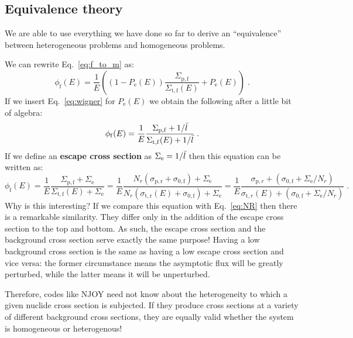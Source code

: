 \documentclass{article}
\begin{document}
\subsection{Equivalence theory}

We are able to use everything we have done so far to derive an ``equivalence'' between heterogeneous problems and homogeneous problems.

We can rewrite Eq.~\eqref{eq:f_to_m} as:
\begin{equation}
    \phi_\mathrm{f}(E) = \frac{1}{E}\left(\left(1-P_{\mathrm{e}}(E)\right)\frac{\Sigma_{\mathrm{p,f}}}{\Sigma_{\mathrm{t,f}}(E)} + P_{\mathrm{e}}(E)\right)\;\mathrm{.}
\end{equation}
If we insert Eq.~\eqref{eq:wigner} for $P_\mathrm{e}(E)$ we obtain the following after a little bit of algebra:
\begin{equation}
    \phi_\mathrm{f}(E) = \frac{1}{E}\frac{\Sigma_\mathrm{p,f}+1/\Bar{l}}{\Sigma_\mathrm{t,f}(E)+1/\Bar{l}}\;\mathrm{.}
\end{equation}
If we define an \textbf{escape cross section} as $\Sigma_\mathrm{e} = 1/\Bar{l}$ then this equation can be written as:
\begin{equation}
    \phi_\mathrm{f}(E) = \frac{1}{E}\frac{\Sigma_\mathrm{p,f}+\Sigma_\mathrm{e}}{\Sigma_\mathrm{t,f}(E) + \Sigma_\mathrm{e}} = \frac{1}{E}\frac{N_r(\sigma_\mathrm{p,r}+\sigma_{0,\mathrm{f}})+\Sigma_\mathrm{e}}{N_r(\sigma_\mathrm{t,r}(E)+\sigma_{0,\mathrm{f}})+\Sigma_\mathrm{e}}=\frac{1}{E}\frac{\sigma_{\mathrm{p},r}+(\sigma_{0,\mathrm{f}}+\Sigma_\mathrm{e}/N_r)}{\sigma_{\mathrm{t},r}(E)+(\sigma_{0,\mathrm{f}}+\Sigma_\mathrm{e}/N_r)}\;\mathrm{.}
\end{equation}
Why is this interesting? If we compare this equation with Eq.~\eqref{eq:NR} then there is a remarkable similarity. They differ only in the addition of the escape cross section to the top and bottom. As such, the escape cross section and the background cross section serve exactly the same purpose! Having a low background cross section is the same as having a low escape cross section and vice versa: the former circumstance means the asymptotic flux will be greatly perturbed, while the latter means it will be unperturbed. 

Therefore, codes like NJOY need not know about the heterogeneity to which a given nuclide cross section is subjected. If they produce cross sections at a variety of different background cross sections, they are equally valid whether the system is homogeneous or heterogenous!
\end{document}
